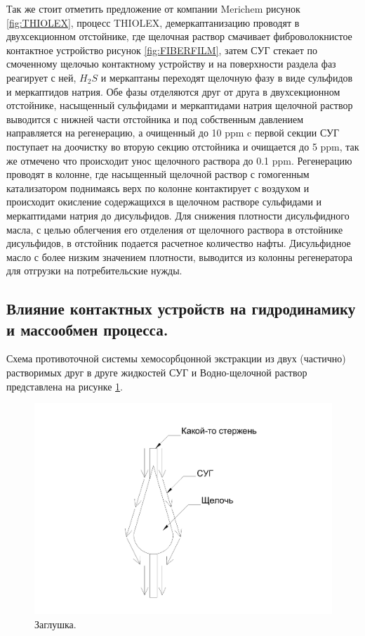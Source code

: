 Так же стоит отметить предложение от компании Merichem рисунок \cref{fig:THIOLEX}, 
процесс THIOLEX, демеркаптанизацию проводят в двухсекционном отстойнике, где щелочная раствор смачивает фиброволокнистое контактное устройство рисунок \cref{fig:FIBERFILM}, затем СУГ стекает по смоченному щелочью контактному устройству и на поверхности раздела фаз реагирует с ней, $H_2S$ и меркаптаны переходят щелочную фазу в виде сульфидов и меркаптидов натрия. Обе фазы отделяются друг от друга в двухсекционном отстойнике, насыщенный сульфидами и меркаптидами натрия щелочной раствор выводится с нижней части отстойника и под собственным давлением направляется на регенерацию, а очищенный до \num{10} ppm c первой секции СУГ поступает на доочистку во вторую секцию отстойника и очищается до \num{5} ppm, так же отмечено что происходит унос щелочного раствора до \num{0,1} ppm. Регенерацию проводят в колонне, где насыщенный щелочной раствор с гомогенным катализатором поднимаясь верх по колонне контактирует с воздухом и происходит окисление содержащихся в щелочном растворе сульфидами и меркаптидами натрия до дисульфидов. Для снижения плотности дисульфидного масла, с целью облегчения его отделения от щелочного раствора в отстойнике дисульфидов, в отстойник подается расчетное количество нафты. Дисульфидное масло с более низким значением плотности, выводится из колонны регенератора для отгрузки на потребительские нужды.

\subsection{Влияние контактных устройств на гидродинамику и массообмен процесса.} \label{sec:ch1/sec3}

Схема противоточной системы хемосорбцонной экстракции из двух (частично) растворимых друг в друге жидкостей СУГ и Водно-щелочной раствор представлена на рисунке \cref{fig:cheme}.

\begin{figure}
	\centering
	\includegraphics[width=0.6\linewidth]{images/fibr}
	\caption{Заглушка.}
	\label{fig:cheme}
\end{figure}

